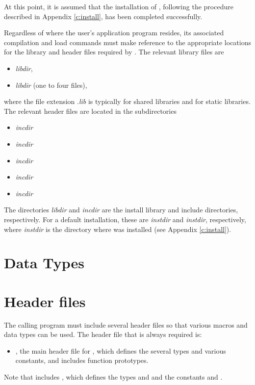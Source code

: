 At this point, it is assumed that the installation of {\cvode},
following the procedure described in Appendix \ref{c:install}, has
been completed successfully.

Regardless of where the user's application program resides, its
associated compilation and load commands must make reference to the
appropriate locations for the library and header files required by
{\cvode}.  The relevant library files are
\begin{itemize}
\item {\em libdir},
\item {\em libdir} (one to four files),
\end{itemize}
where the file extension .{\em lib} is typically  for shared libraries
and  for static libraries. The relevant header files are located in
the subdirectories
\begin{itemize}
\item {\em incdir}
\item {\em incdir}
\item {\em incdir}
\item {\em incdir}
\item {\em incdir}
\end{itemize}
The directories {\em libdir} and {\em incdir} are the install library and include
directories, respectively. For a default installation, these are {\em instdir} and
{\em instdir}, respectively, where {\em instdir} is the directory
where {\sundials} was installed (see Appendix \ref{c:install}).


\section{Data Types}\label{s:types}


\section{Header files}\label{ss:header_sim}
The calling program must include several header files so that various macros
and data types can be used. The header file that is always required is:
\begin{itemize}
\item  {}, 
  the main header file for {\cvode}, which defines the several
  types and various constants, and includes function prototypes.
\end{itemize}
Note that  includes , 
which defines the types  and 
and the constants  and .

